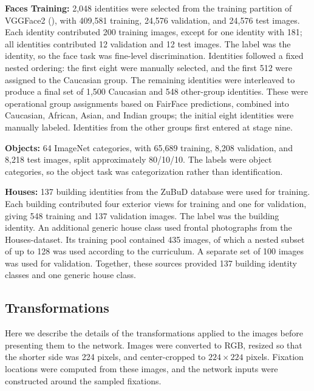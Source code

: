 \textbf{Faces Training: }2,048 identities were selected from the training partition of VGGFace2 (\cite{cao2018vggface2}), with 409,581 training, 24,576 validation, and 24,576 test images. Each identity contributed 200 training images, except for one identity with 181; all identities contributed 12 validation and 12 test images. The label was the identity, so the face task was fine-level discrimination. Identities followed a fixed nested ordering: the first eight were manually selected, and the first 512 were assigned to the Caucasian group. The remaining identities were interleaved to produce a final set of 1,500 Caucasian and 548 other-group identities. These were operational group assignments based on FairFace predictions, combined into Caucasian, African, Asian, and Indian groups; the initial eight identities were manually labeled. Identities from the other groups first entered at stage nine.

\textbf{Objects: }64 ImageNet categories, with 65,689 training, 8,208 validation, and 8,218 test images, split approximately 80/10/10. The labels were object categories, so the object task was categorization rather than identification.

\textbf{Houses: }137 building identities from the ZuBuD database were used for training. Each building contributed four exterior views for training and one for validation, giving 548 training and 137 validation images. The label was the building identity. An additional generic house class used frontal photographs from the Houses-dataset. Its training pool contained 435 images, of which a nested subset of up to 128 was used according to the curriculum. A separate set of 100 images was used for validation. Together, these sources provided 137 building identity classes and one generic house class.

\subsection{Transformations}
Here we describe the details of the transformations applied to the images before presenting them to the network. Images were converted to RGB, resized so that the shorter side was 224 pixels, and center-cropped to $224\times224$ pixels. Fixation locations were computed from these images, and the network inputs were constructed around the sampled fixations.

